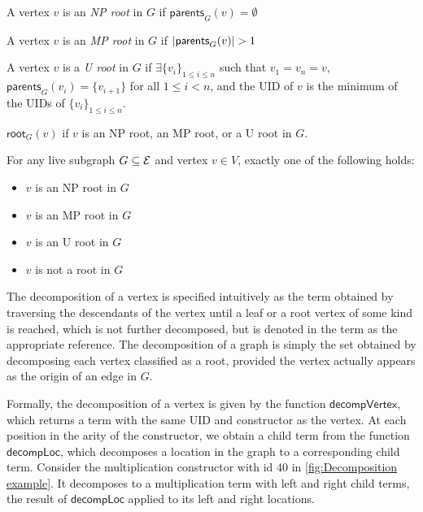 \begin{definition}
    A vertex $v$ is an \textit{NP root} in $G$ if $\mathsf{parents}_{G}(v)=\emptyset$
\end{definition}

\begin{definition}
    A vertex $v$ is an \textit{MP root} in $G$ if $\left\lvert\mathsf{parents}_{G}(v)\right\rvert > 1$
\end{definition}

\begin{definition}
    A vertex $v$ is a \textit{U root} in $G$ if $\exists \{v_i\}_{1 \leq i \leq n}$ such that $v_1 = v_n = v$, $\mathsf{parents}_{G}(v_i)=\{v_{i+1}\}$ for all $1 \leq i < n$, and the UID of $v$ is the minimum of the UIDs of $\{v_i\}_{1 \leq i \leq n}$.
\end{definition}

\begin{definition}
    $\mathsf{root}_G(v)$ if $v$ is an NP root, an MP root, or a U root in $G$.
\end{definition}

\begin{lemma}
\label{lem:uniq-classification}
    For any live subgraph $G\subseteq \mathcal{E}$ and vertex $v\in V$, exactly one of the following holds: 
    \begin{itemize}
        \item $v$ is an NP root in $G$
        \item $v$ is an MP root in $G$
        \item $v$ is an U root in $G$
        \item $v$ is not a root in $G$
    \end{itemize}
\end{lemma}

The decomposition of a vertex is specified intuitively as the term obtained by traversing the descendants of the vertex until a leaf or a root vertex of some kind is reached, which is not further decomposed, but is denoted in the term as the appropriate reference. The decomposition of a graph is simply the set obtained by decomposing each vertex classified as a root, provided the vertex actually appears as the origin of an edge in $G$.

Formally, the decomposition of a vertex is given by the function $\mathsf{decompVertex}$, which returns a term with the same UID and constructor as the vertex. At each position in the arity of the constructor, we obtain a child term from the function $\mathsf{decompLoc}$, which decomposes a location in the graph to a corresponding child term. Consider the multiplication constructor with id 40 in \autoref{fig:Decomposition example}. It decomposes to a multiplication term with left and right child terms, the result of $\mathsf{decompLoc}$ applied to its left and right locations. 

